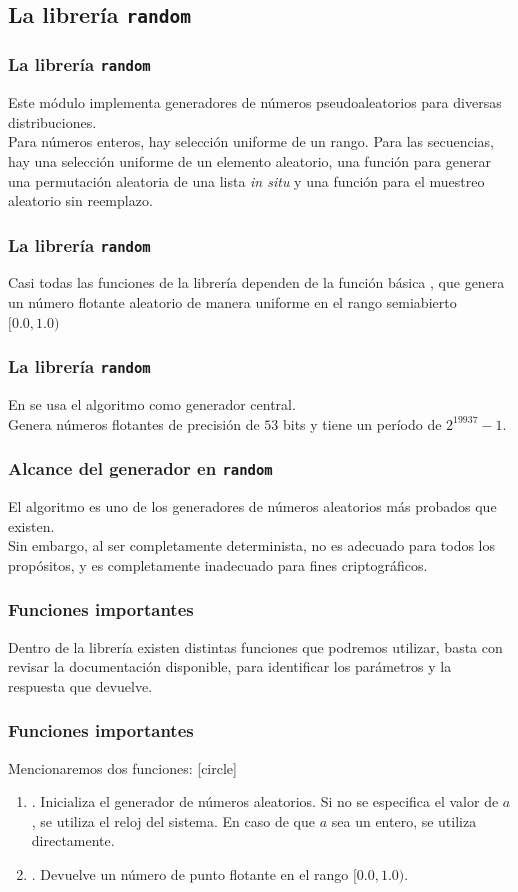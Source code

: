 \subsection{La librería \texttt{random}}
\begin{frame}
\frametitle{La librería \texttt{random}}
Este módulo implementa generadores de números pseudoaleatorios para diversas distribuciones.
\\
\bigskip
Para números enteros, hay selección uniforme de un rango. Para las secuencias, hay una selección uniforme de un elemento aleatorio, una función para generar una permutación aleatoria de una lista \emph{in situ} y una función para el muestreo aleatorio sin reemplazo.
\end{frame}
\begin{frame}
\frametitle{La librería \texttt{random}}
Casi todas las funciones de la librería dependen de la función básica , que genera un número flotante aleatorio de manera uniforme en el rango semiabierto $[0.0, 1.0)$
\end{frame}
\begin{frame}
\frametitle{La librería \texttt{random}}
En \python{} se usa el algoritmo  como generador central.
\\
\bigskip
Genera números flotantes de precisión de $53$ bits y tiene un período de $2^{19937}-1$.
\end{frame}
\begin{frame}
\frametitle{Alcance del generador en \texttt{random}}
El algoritmo  es uno de los generadores de números aleatorios más probados que existen.
\\
\bigskip
Sin embargo, al ser completamente determinista, no es adecuado para todos los propósitos, y es completamente inadecuado para fines criptográficos.
\end{frame}
\begin{frame}
\frametitle{Funciones importantes}
Dentro de la librería  existen distintas funciones que podremos utilizar, basta con revisar la documentación disponible, para identificar los parámetros y la respuesta que devuelve.
\end{frame}
\begin{frame}
\frametitle{Funciones importantes}
Mencionaremos dos funciones:
[circle]
\begin{enumerate}[<+->]
\item {}. Inicializa el generador de números aleatorios. Si no se especifica el valor de $a$, se utiliza el reloj del sistema. En caso de que $a$ sea un entero, se utiliza directamente.
\item {}. Devuelve un número de punto flotante en el rango $[0.0, 1.0)$.
\end{enumerate}
\end{frame}
